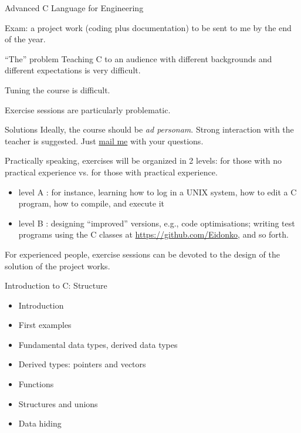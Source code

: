\begin{frame}[fragile]{Advanced C Language for Engineering}

Exam: a project work (coding plus documentation) to be 
sent to me by the end of the year.

\vspace*{1cm}


\end{frame}
\begin{frame}[fragile]{``The'' problem}
Teaching C to an audience with different backgrounds and
different expectations is very difficult.


\vspace{20pt}

Tuning the course is difficult.


\vspace{20pt}

Exercise sessions are particularly problematic.
\end{frame}

\begin{frame}[fragile]{Solutions}
Ideally, the course should be \emph{ad personam}.
Strong interaction with the teacher is
suggested. Just \href{mailto:Eidon@tutanota.be}{mail me} with your questions.


\vspace{20pt}

Practically speaking, exercises will be organized in 2 levels:
for those with no practical experience vs. for those with
practical experience.

\begin{itemize}
\item level A : for instance, learning how to log in a UNIX
	system, how to edit a C program, how to compile, and execute it
\item level B : designing ``improved'' versions, e.g., code optimisations;
writing test programs using the C classes at
\url{https://github.com/Eidonko}, and so forth.
\end{itemize}


\vspace{20pt}

For experienced people,
exercise sessions can be devoted to the design of the
solution of the project works.
\end{frame}

\begin{frame}[fragile]{Introduction to C: Structure}
\begin{itemize}
\item Introduction 
\item First examples
\item Fundamental data types, derived data types
\item Derived types: pointers and vectors
\item Functions
\item Structures and unions
\item Data hiding
\end{itemize}
\end{frame}

